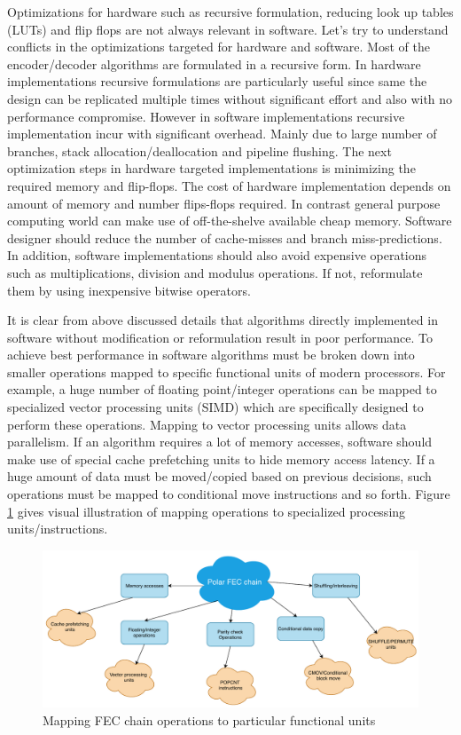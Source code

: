 Optimizations for hardware such as recursive formulation, reducing look up tables (LUTs) and flip flops are not always relevant in software. Let's try to understand conflicts in the optimizations targeted for hardware and software. Most of the encoder/decoder algorithms are formulated in a recursive form. In hardware implementations recursive formulations are particularly useful since same the design can be replicated multiple times without significant effort and also with no performance compromise. However in software implementations recursive implementation incur with significant overhead. Mainly due to large number of branches, stack allocation/deallocation and pipeline flushing. The next optimization steps in hardware targeted implementations is minimizing the required memory and flip-flops. The cost of hardware implementation depends on amount of memory and number flips-flops required\cite{minimizeFPGAResource}. In contrast general purpose computing world can make use of off-the-shelve available cheap memory. Software designer should reduce the number of cache-misses and branch miss-predictions\cite{cacheMiss}. In addition, software implementations should also avoid expensive operations such as multiplications, division and modulus operations. If not, reformulate them by using inexpensive bitwise operators. \newline

It is clear from above discussed details that algorithms directly implemented in software without modification or reformulation result in poor performance. To achieve best performance in software algorithms must be broken down into smaller operations mapped to specific functional units of modern processors. For example, a huge number of floating point/integer operations can be mapped to specialized vector processing units (SIMD) which are specifically designed to perform these operations. Mapping to vector processing units allows data parallelism. If an algorithm requires a lot of memory accesses, software should make use of special cache prefetching units to hide memory access latency. If a huge amount of data must be moved/copied based on previous decisions, such operations must be mapped to conditional move instructions and so forth.  Figure \ref{fig:operationMapping} gives visual illustration of mapping operations to specialized processing units/instructions.

\begin{figure}[]
	\centering
	\includegraphics[width=1\textwidth]{./figures/operationMapping.pdf}
	\caption{Mapping FEC chain operations to particular functional units}
	\label{fig:operationMapping}
\end{figure}

